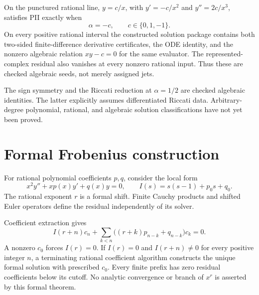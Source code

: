 \begin{theorem}
\label{thm:painleve-simple-pole}
On the punctured rational line, $y=c/x$, with
$y'=-c/x^2$ and $y''=2c/x^3$, satisfies PII exactly when
\[
  \alpha=-c,\qquad c\in\{0,1,-1\}.
\]
On every positive rational interval the constructed solution package
contains both two-sided finite-difference derivative certificates, the ODE
identity, and the nonzero algebraic relation $xy-c=0$ for the same evaluator.
The represented-complex residual also vanishes at every nonzero rational
input. Thus these are checked algebraic seeds, not merely assigned jets.
\leanok
\end{theorem}

The sign symmetry and the Riccati reduction at $\alpha=1/2$ are checked
algebraic identities. The latter explicitly assumes differentiated Riccati
data. Arbitrary-degree polynomial, rational, and algebraic solution
classifications have not yet been proved.

\section{Formal Frobenius construction}

For rational polynomial coefficients $p,q$, consider the local form
\[
 x^2y''+xp(x)y'+q(x)y=0,\qquad I(s)=s(s-1)+p_0s+q_0.
\]
The rational exponent $r$ is a formal shift. Finite Cauchy products and
shifted Euler operators define the residual independently of its solver.

\begin{theorem}
\label{thm:frobenius-formal}
Coefficient extraction gives
\[
 I(r+n)c_n+\sum_{k<n}\bigl((r+k)p_{n-k}+q_{n-k}\bigr)c_k=0.
\]
A nonzero $c_0$ forces $I(r)=0$. If $I(r)=0$ and $I(r+n)\ne0$ for every
positive integer $n$, a terminating rational coefficient algorithm constructs
the unique formal solution with prescribed $c_0$. Every finite prefix has
zero residual coefficients below its cutoff. No analytic convergence or
branch of $x^r$ is asserted by this formal theorem.
\leanok
\end{theorem}

